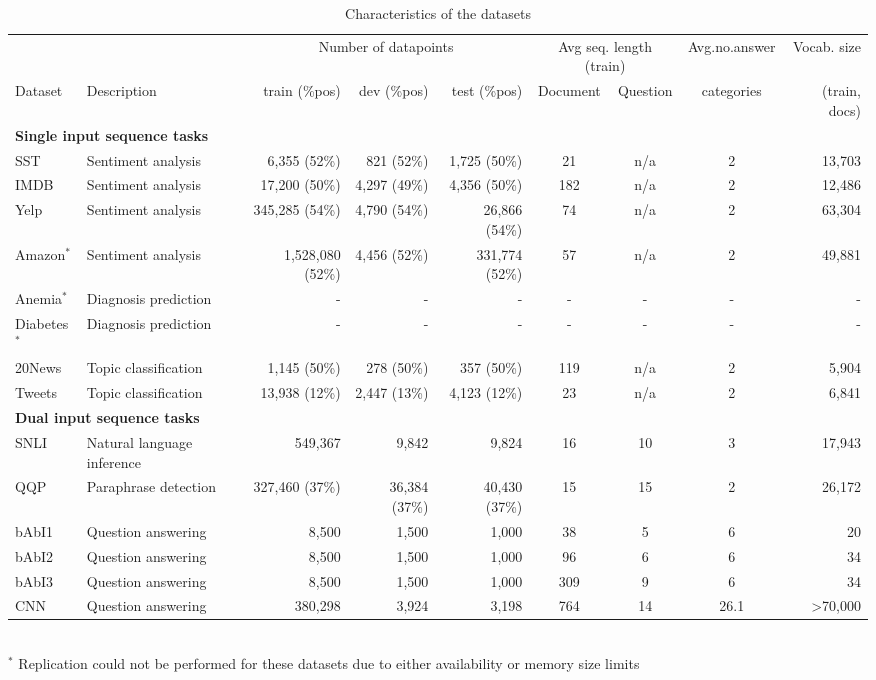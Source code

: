 \begin{table}[h]
    \tiny
    \centering
    \begin{tabular}{llrrrcccr}
    \toprule
    & & \multicolumn{3}{c}{Number of datapoints} & \multicolumn{2}{c}{Avg seq. length (train)} & Avg.no.answer & Vocab. size\\
    Dataset & Description & train (\%pos) & dev (\%pos) & test (\%pos) & Document & Question & categories& (train, docs)\\
    \cmidrule(r){1-2} \cmidrule(r){3-5} \cmidrule(r){6-7} \cmidrule(r){8-8} \cmidrule(r){9-9}
    \multicolumn{5}{l}{\textbf{Single input sequence tasks}}\\
    \cmidrule(r){1-9}
        SST & Sentiment analysis  & 6,355 (52\%) & 821 (52\%) & 1,725 (50\%) & 21 & n/a & 2 & 13,703\\
        IMDB & Sentiment analysis  & 17,200 (50\%)& 4,297 (49\%) & 4,356 (50\%) & 182 & n/a & 2& 12,486\\
        Yelp & Sentiment analysis &345,285 (54\%)&4,790 (54\%)&26,866 (54\%)&74&n/a&2&63,304  \\
        Amazon$^*$&Sentiment analysis&1,528,080 (52\%)&4,456 (52\%)&331,774 (52\%)&57&n/a&2&49,881\\
        Anemia$^*$&Diagnosis prediction&-&-&-&-&-&-&-\\
        Diabetes$^*$&Diagnosis prediction&-&-&-&-&-&-&-\\
        20News & Topic classification & 1,145 (50\%)&278 (50\%) &357 (50\%)&119&n/a&2&5,904\\
        Tweets & Topic classification & 13,938 (12\%)&2,447 (13\%)&4,123 (12\%)&23&n/a&2&6,841 \\
    \cmidrule(r){1-2} \cmidrule(r){3-5} \cmidrule(r){6-7} \cmidrule(r){8-8} \cmidrule(r){9-9}    
    \multicolumn{5}{l}{\textbf{Dual input sequence tasks}}\\ 
    \cmidrule(r){1-9}
        SNLI & Natural language inference & 549,367 & 9,842 & 9,824 & 16 & 10 & 3& 17,943\\
        QQP & Paraphrase detection & 327,460 (37\%)&36,384 (37\%)&40,430 (37\%) &15&15&2&26,172\\
        bAbI1 & Question answering & 8,500 & 1,500 & 1,000& 38&5& 6 & 20\\
        bAbI2 & Question answering&8,500&1,500&1,000&96&6&6&34\\
        bAbI3 & Question answering&8,500&1,500&1,000&309&9&6&34\\
        CNN & Question answering&380,298&3,924&3,198&764&14&26.1&>70,000\\
        \bottomrule
    \end{tabular}\\
    \tiny{$^*$ Replication could not be performed for these datasets due to either availability or memory size limits}\\
    \caption{Characteristics of the datasets}
    \label{tab:datasets}
\end{table}

